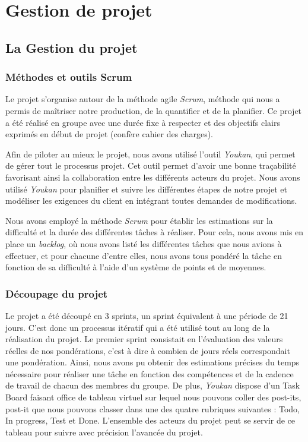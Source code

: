 \chapter{Gestion de projet}
\minitoc

\section{La Gestion du projet}

\subsection{Méthodes et outils Scrum}

Le projet s'organise autour de la méthode agile \emph{Scrum}, méthode qui nous a permis de maîtriser notre production, de la quantifier et de la planifier. Ce projet a été réalisé en groupe avec une durée fixe à respecter et des objectifs clairs exprimés en début de projet (confère cahier des charges).

Afin de piloter au mieux le projet, nous avons utilisé l'outil \emph{Youkan}, qui permet de gérer tout le processus projet. Cet outil permet d'avoir une bonne traçabilité favorisant ainsi la collaboration entre les différents acteurs du projet.
Nous avons utilisé \emph{Youkan} pour planifier et suivre les différentes étapes de notre projet et modéliser les exigences du client en intégrant toutes demandes de modifications.

Nous avons employé la méthode \emph{Scrum} pour établir les estimations sur la difficulté et la durée des différentes tâches à réaliser. Pour cela, nous avons mis en place un \emph{backlog}, où nous avons listé les différentes tâches que nous avions à effectuer, et pour chacune d'entre elles, nous avons tous pondéré la tâche en fonction de sa difficulté à l'aide d'un système de points et de moyennes. 

\subsection{Découpage du projet}

Le projet a été découpé en 3 sprints, un sprint équivalent à une période de 21 jours. C'est donc un processus itératif qui a été utilisé tout au long de la réalisation du projet. Le premier sprint consistait en l'évaluation des valeurs réelles de nos pondérations, c'est à dire à combien de jours réels correspondait une pondération. Ainsi, nous avons pu obtenir des estimations précises du temps nécessaire pour réaliser une tâche en fonction des compétences et de la cadence de travail de chacun des membres du groupe. 
De plus, \emph{Youkan} dispose d'un Task Board faisant office de tableau virtuel sur lequel nous pouvons coller des post-its, post-it que nous pouvons classer dans une des quatre rubriques suivantes : Todo, In progress, Test et Done. L'ensemble des acteurs du projet peut se servir de ce tableau pour suivre avec précision l'avancée du projet.

